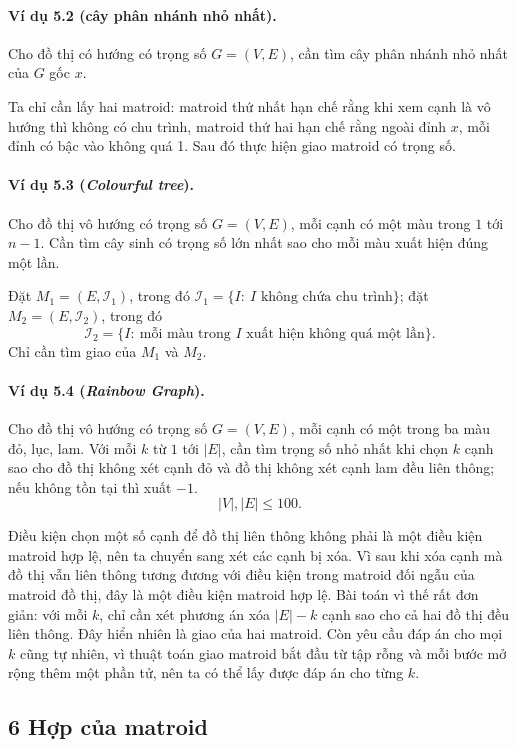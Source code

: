 \documentclass[11pt]{article}
\begin{document}
\paragraph{Ví dụ 5.2 (cây phân nhánh nhỏ nhất).}
Cho đồ thị có hướng có trọng số \(G=(V,E)\), cần tìm cây phân nhánh nhỏ nhất của
\(G\) gốc \(x\).

Ta chỉ cần lấy hai matroid: matroid thứ nhất hạn chế rằng khi xem cạnh là vô
hướng thì không có chu trình, matroid thứ hai hạn chế rằng ngoài đỉnh \(x\), mỗi
đỉnh có bậc vào không quá 1. Sau đó thực hiện giao matroid có trọng số.

\paragraph{Ví dụ 5.3 (\emph{Colourful tree}).}
Cho đồ thị vô hướng có trọng số \(G=(V,E)\), mỗi cạnh có một màu trong
\(1\) tới \(n-1\). Cần tìm cây sinh có trọng số lớn nhất sao cho mỗi màu xuất
hiện đúng một lần.

Đặt \(M_1=(E,\mathcal I_1)\), trong đó
\(\mathcal I_1=\{I:\ I\text{ không chứa chu trình}\}\); đặt
\(M_2=(E,\mathcal I_2)\), trong đó
\[
  \mathcal I_2=\{I:\ \text{mỗi màu trong }I
  \text{ xuất hiện không quá một lần}\}.
\]
Chỉ cần tìm giao của \(M_1\) và \(M_2\).

\paragraph{Ví dụ 5.4 (\emph{Rainbow Graph}).}
Cho đồ thị vô hướng có trọng số \(G=(V,E)\), mỗi cạnh có một trong ba màu đỏ,
lục, lam. Với mỗi \(k\) từ \(1\) tới \(|E|\), cần tìm trọng số nhỏ nhất khi chọn
\(k\) cạnh sao cho đồ thị không xét cạnh đỏ và đồ thị không xét cạnh lam đều
liên thông; nếu không tồn tại thì xuất \(-1\).
\[
  |V|,|E|\le 100.
\]

Điều kiện chọn một số cạnh để đồ thị liên thông không phải là một điều kiện
matroid hợp lệ, nên ta chuyển sang xét các cạnh bị xóa. Vì sau khi xóa cạnh mà
đồ thị vẫn liên thông tương đương với điều kiện trong matroid đối ngẫu của
matroid đồ thị, đây là một điều kiện matroid hợp lệ. Bài toán vì thế rất đơn
giản: với mỗi \(k\), chỉ cần xét phương án xóa \(|E|-k\) cạnh sao cho cả hai đồ
thị đều liên thông. Đây hiển nhiên là giao của hai matroid. Còn yêu cầu đáp án
cho mọi \(k\) cũng tự nhiên, vì thuật toán giao matroid bắt đầu từ tập rỗng và
mỗi bước mở rộng thêm một phần tử, nên ta có thể lấy được đáp án cho từng \(k\).

\subsection*{6 Hợp của matroid}
\end{document}
